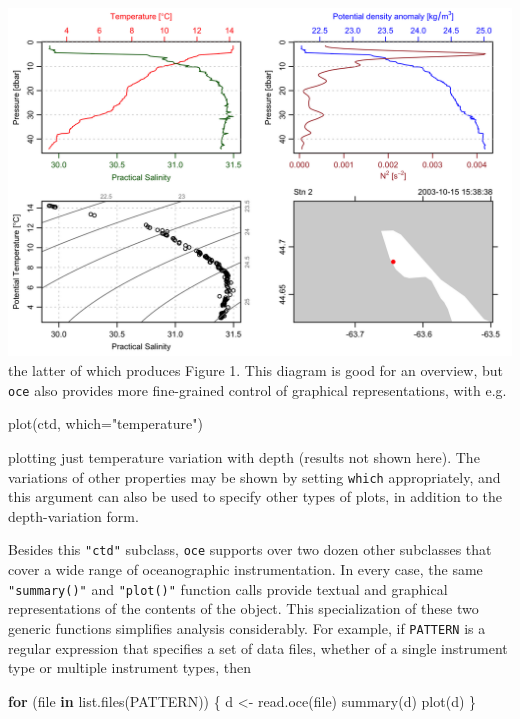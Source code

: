 \documentclass[10pt,a4paper,onecolumn]{article}
\newenvironment{Shaded}{\begin{snugshade}}{\end{snugshade}}
\newcommand{\AttributeTok}[1]{\textcolor[rgb]{0.77,0.63,0.00}{#1}}
\newcommand{\ControlFlowTok}[1]{\textcolor[rgb]{0.13,0.29,0.53}{\textbf{#1}}}
\newcommand{\FunctionTok}[1]{\textcolor[rgb]{0.00,0.00,0.00}{#1}}
\newcommand{\NormalTok}[1]{#1}
\newcommand{\OtherTok}[1]{\textcolor[rgb]{0.56,0.35,0.01}{#1}}
\newcommand{\StringTok}[1]{\textcolor[rgb]{0.31,0.60,0.02}{#1}}
\begin{document}
\includegraphics{unnamed-chunk-2-1.png} the latter of which produces
Figure 1. This diagram is good for an overview, but \texttt{oce} also
provides more fine-grained control of graphical representations, with
e.g.

\begin{Shaded}
\begin{Highlighting}[]
\FunctionTok{plot}\NormalTok{(ctd, }\AttributeTok{which=}\StringTok{"temperature"}\NormalTok{)}
\end{Highlighting}
\end{Shaded}

plotting just temperature variation with depth (results not shown here).
The variations of other properties may be shown by setting
\texttt{which} appropriately, and this argument can also be used to
specify other types of plots, in addition to the depth-variation form.

Besides this \texttt{"ctd"} subclass, \texttt{oce} supports over two
dozen other subclasses that cover a wide range of oceanographic
instrumentation. In every case, the same \texttt{"summary()"} and
\texttt{"plot()"} function calls provide textual and graphical
representations of the contents of the object. This specialization of
these two generic functions simplifies analysis considerably. For
example, if \texttt{PATTERN} is a regular expression that specifies a
set of data files, whether of a single instrument type or multiple
instrument types, then

\begin{Shaded}
\begin{Highlighting}[]
\ControlFlowTok{for}\NormalTok{ (file }\ControlFlowTok{in} \FunctionTok{list.files}\NormalTok{(PATTERN)) \{}
\NormalTok{    d }\OtherTok{\textless{}{-}} \FunctionTok{read.oce}\NormalTok{(file)}
    \FunctionTok{summary}\NormalTok{(d)}
    \FunctionTok{plot}\NormalTok{(d)}
\NormalTok{\}}
\end{Highlighting}
\end{Shaded}
\end{document}
